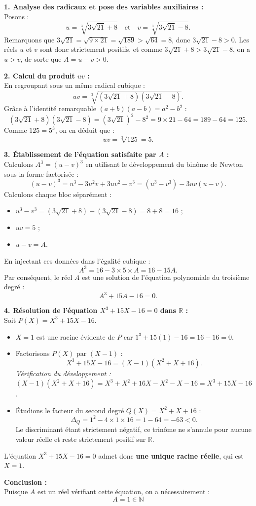 \documentclass[11pt,a4paper]{article}
\begin{document}
\begin{correctionbox}
\textbf{1. Analyse des radicaux et pose des variables auxiliaires :}\\
Posons :
\[
u = \sqrt[3]{3\sqrt{21} + 8} \quad \text{et} \quad v = \sqrt[3]{3\sqrt{21} - 8}.
\]
Remarquons que $3\sqrt{21} = \sqrt{9 \times 21} = \sqrt{189} > \sqrt{64} = 8$, donc $3\sqrt{21} - 8 > 0$. Les réels $u$ et $v$ sont donc strictement positifs, et comme $3\sqrt{21} + 8 > 3\sqrt{21} - 8$, on a $u > v$, de sorte que $A = u - v > 0$.

\textbf{2. Calcul du produit $uv$ :}\\
En regroupant sous un même radical cubique :
\[
uv = \sqrt[3]{(3\sqrt{21} + 8)(3\sqrt{21} - 8)}.
\]
Grâce à l'identité remarquable $(a+b)(a-b) = a^2 - b^2$ :
\[
(3\sqrt{21} + 8)(3\sqrt{21} - 8) = (3\sqrt{21})^2 - 8^2 = 9 \times 21 - 64 = 189 - 64 = 125.
\]
Comme $125 = 5^3$, on en déduit que :
\[
uv = \sqrt[3]{125} = 5.
\]

\textbf{3. Établissement de l'équation satisfaite par $A$ :}\\
Calculons $A^3 = (u - v)^3$ en utilisant le développement du binôme de Newton sous la forme factorisée :
\[
(u - v)^3 = u^3 - 3u^2 v + 3uv^2 - v^3 = (u^3 - v^3) - 3uv(u - v).
\]
Calculons chaque bloc séparément :
\begin{itemize}[leftmargin=*,label=\textbullet]
    \item $u^3 - v^3 = (3\sqrt{21} + 8) - (3\sqrt{21} - 8) = 8 + 8 = 16$ ;
    \item $uv = 5$ ;
    \item $u - v = A$.
\end{itemize}
En injectant ces données dans l'égalité cubique :
\[
A^3 = 16 - 3 \times 5 \times A = 16 - 15A.
\]
Par conséquent, le réel $A$ est une solution de l'équation polynomiale du troisième degré :
\[
A^3 + 15A - 16 = 0.
\]

\textbf{4. Résolution de l'équation $X^3 + 15X - 16 = 0$ dans $\mathbb{R}$ :}\\
Soit $P(X) = X^3 + 15X - 16$.
\begin{itemize}[leftmargin=*,label=\textbullet]
    \item $X = 1$ est une racine évidente de $P$ car $1^3 + 15(1) - 16 = 16 - 16 = 0$.
    \item Factorisons $P(X)$ par $(X - 1)$ :
    \[
    X^3 + 15X - 16 = (X - 1)(X^2 + X + 16).
    \]
    \textit{Vérification du développement :}
    $(X - 1)(X^2 + X + 16) = X^3 + X^2 + 16X - X^2 - X - 16 = X^3 + 15X - 16$.
    \item Étudions le facteur du second degré $Q(X) = X^2 + X + 16$ :
    \[
    \Delta_Q = 1^2 - 4 \times 1 \times 16 = 1 - 64 = -63 < 0.
    \]
    Le discriminant étant strictement négatif, ce trinôme ne s'annule pour aucune valeur réelle et reste strictement positif sur $\mathbb{R}$.
\end{itemize}
L'équation $X^3 + 15X - 16 = 0$ admet donc \textbf{une unique racine réelle}, qui est $X = 1$.

\textbf{Conclusion :}\\
Puisque $A$ est un réel vérifiant cette équation, on a nécessairement :
\[
\boxed{A = 1 \in \mathbb{N}}
\]
\end{correctionbox}
\end{document}
